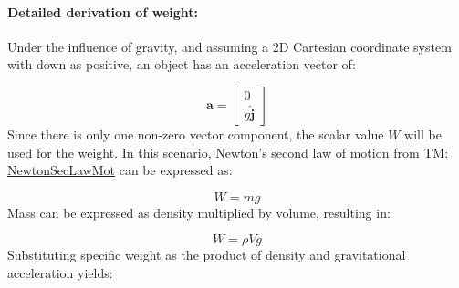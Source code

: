 \documentclass[12pt]{article}
\begin{document}
\paragraph{Detailed derivation of weight:}
\label{GD:weightDeriv}
Under the influence of gravity, and assuming a 2D Cartesian coordinate system with down as positive, an object has an acceleration vector of:

\begin{displaymath}
\mathbf{a}=\begin{bmatrix}
           0\\
g \mathbf{\hat{j}}
           \end{bmatrix}
\end{displaymath}
Since there is only one non-zero vector component, the scalar value $W$ will be used for the weight. In this scenario, Newton's second law of motion from \hyperref[TM:NewtonSecLawMot]{TM: NewtonSecLawMot} can be expressed as:

\begin{displaymath}
W=m g
\end{displaymath}
Mass can be expressed as density multiplied by volume, resulting in:

\begin{displaymath}
W=ρ V g
\end{displaymath}
Substituting specific weight as the product of density and gravitational acceleration yields:
\end{document}
